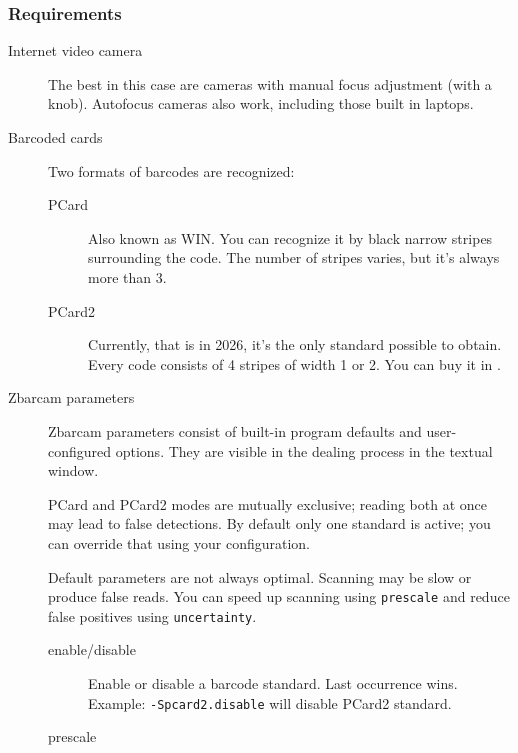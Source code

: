 \documentclass[polish,a4paper,11pt,oneside]{article}
\begin{document}
\subsubsection{Requirements}
\begin{description}
\item[Internet video camera]
  The best in this case are cameras with manual focus adjustment (with a knob).
  Autofocus cameras also work, including those built in laptops.
  
\item[Barcoded cards]
  Two formats of barcodes are recognized:
  
  \begin{description}
  
  \item[PCard]
  Also known as WIN. You can recognize it by black narrow stripes
  surrounding the code. The number of stripes varies, but it's always more than 3.
  
  \item[PCard2]
  Currently, that is in 2026, it's the only standard possible to obtain.
  Every code consists of 4 stripes of width 1 or 2.
  You can buy it in \bridgepollink.
  
  \end{description}
  
\item[Zbarcam parameters]

  Zbarcam parameters consist of built-in program defaults and user-configured
  options. They are visible in the dealing process in the textual window.

  PCard and PCard2 modes are mutually exclusive; reading both at once may
  lead to false detections. By default only one standard is active; you can
  override that using your configuration.

  Default parameters are not always optimal. Scanning may be slow or produce
  false reads. You can speed up scanning using \verb!prescale! and reduce false
  positives using \verb!uncertainty!.

  \begin{description}

    \item[enable/disable]

    Enable or disable a barcode standard. Last occurrence wins.
    Example: \verb!-Spcard2.disable! will disable PCard2 standard.

    \item[prescale]


\end{description}
\end{description}
\end{document}
